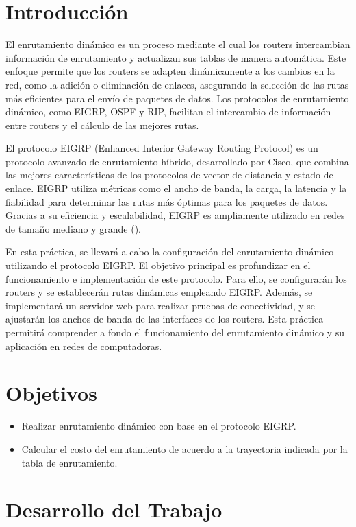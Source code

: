 \setcounter{page}{1}


\section{Introducción}
El enrutamiento dinámico es un proceso mediante el cual los routers intercambian información de enrutamiento y actualizan sus tablas de manera automática. Este enfoque permite que los routers se adapten dinámicamente a los cambios en la red, como la adición o eliminación de enlaces, asegurando la selección de las rutas más eficientes para el envío de paquetes de datos. Los protocolos de enrutamiento dinámico, como EIGRP, OSPF y RIP, facilitan el intercambio de información entre routers y el cálculo de las mejores rutas.

El protocolo EIGRP (Enhanced Interior Gateway Routing Protocol) es un protocolo avanzado de enrutamiento híbrido, desarrollado por Cisco, que combina las mejores características de los protocolos de vector de distancia y estado de enlace. EIGRP utiliza métricas como el ancho de banda, la carga, la latencia y la fiabilidad para determinar las rutas más óptimas para los paquetes de datos. Gracias a su eficiencia y escalabilidad, EIGRP es ampliamente utilizado en redes de tamaño mediano y grande (\cite{cisco}).

En esta práctica, se llevará a cabo la configuración del enrutamiento dinámico utilizando el protocolo EIGRP. El objetivo principal es profundizar en el funcionamiento e implementación de este protocolo. Para ello, se configurarán los routers y se establecerán rutas dinámicas empleando EIGRP. Además, se implementará un servidor web para realizar pruebas de conectividad, y se ajustarán los anchos de banda de las interfaces de los routers. Esta práctica permitirá comprender a fondo el funcionamiento del enrutamiento dinámico y su aplicación en redes de computadoras.
\section{Objetivos}
    \begin{itemize}
        \item Realizar enrutamiento dinámico con base en el protocolo EIGRP.
        \item Calcular el costo del enrutamiento de acuerdo a la trayectoria indicada por la tabla de enrutamiento.
    \end{itemize}

\section{Desarrollo del Trabajo}
